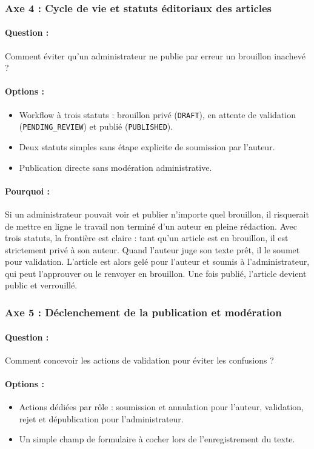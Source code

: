 \documentclass[11pt,a4paper]{article}
\begin{document}
\subsubsection{Axe 4 : Cycle de vie et statuts éditoriaux des articles}
\paragraph{Question :} Comment éviter qu'un administrateur ne publie par erreur un brouillon inachevé ?
\paragraph{Options :}
\begin{itemize}
    \item[$\boxtimes$] Workflow à trois statuts : brouillon privé (\texttt{DRAFT}), en attente de validation (\texttt{PENDING\_REVIEW}) et publié (\texttt{PUBLISHED}).
    \item[$\square$] Deux statuts simples sans étape explicite de soumission par l'auteur.
    \item[$\square$] Publication directe sans modération administrative.
\end{itemize}
\paragraph{Pourquoi :} Si un administrateur pouvait voir et publier n'importe quel brouillon, il risquerait de mettre en ligne le travail non terminé d'un auteur en pleine rédaction. Avec trois statuts, la frontière est claire : tant qu'un article est en brouillon, il est strictement privé à son auteur. Quand l'auteur juge son texte prêt, il le soumet pour validation. L'article est alors gelé pour l'auteur et soumis à l'administrateur, qui peut l'approuver ou le renvoyer en brouillon. Une fois publié, l'article devient public et verrouillé.

\subsubsection{Axe 5 : Déclenchement de la publication et modération}
\paragraph{Question :} Comment concevoir les actions de validation pour éviter les confusions ?
\paragraph{Options :}
\begin{itemize}
    \item[$\boxtimes$] Actions dédiées par rôle : soumission et annulation pour l'auteur, validation, rejet et dépublication pour l'administrateur.
    \item[$\square$] Un simple champ de formulaire à cocher lors de l'enregistrement du texte.
\end{itemize}
\end{document}
